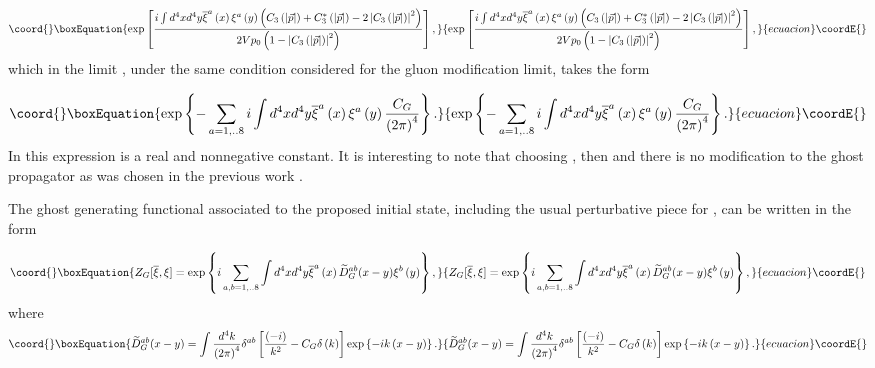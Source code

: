 \documentclass[12pt,letterpaper]{report}
\begin{document}
\begin{equation}\coord{}\boxEquation{
\exp \left[ \frac{i\int d^4xd^4y\overline{\xi }^a\left(x\right)
\xi ^a\left(y\right) \left(C_3\left(\left| \vec{p}\right| \right)
+C_3^{*}\left(\left| \vec{p}\right| \right) -2\left| C_3\left(
\left| \vec{p }\right| \right) \right| ^2\right) }{2Vp_0\left(
1-\left| C_3\left(\left| \vec{p}\right| \right) \right| ^2\right)
}\right],
}{
\exp \left[ \frac{i\int d^4xd^4y\overline{\xi }^a\left(x\right)
\xi ^a\left(y\right) \left(C_3\left(\left| \vec{p}\right| \right)
+C_3^{*}\left(\left| \vec{p}\right| \right) -2\left| C_3\left(
\left| \vec{p }\right| \right) \right| ^2\right) }{2Vp_0\left(
1-\left| C_3\left(\left| \vec{p}\right| \right) \right| ^2\right)
}\right],
}{ecuacion}\coordE{}\end{equation}
which in the limit \coordHE{}, under the same
condition considered for the gluon modification limit, takes the
form

\begin{equation}\coord{}\boxEquation{
\exp \left\{ -\sum\limits_{a=1,..8}i\int d^4xd^4y\overline{\xi
}^a\left(x\right) \xi ^a\left(y\right) \frac{C_G}{\left(2\pi
\right) ^4}\right\}.
}{
\exp \left\{ -\sum\limits_{a=1,..8}i\int d^4xd^4y\overline{\xi
}^a\left(x\right) \xi ^a\left(y\right) \frac{C_G}{\left(2\pi
\right) ^4}\right\}.
}{ecuacion}\coordE{}\end{equation}
In this expression \coordHE{} is a real and nonnegative constant. It is
interesting to note that choosing \coordHE{}, then
\coordHE{} and there is no modification to the ghost propagator as
was chosen in the previous work \cite{Cabo}.

The ghost generating functional associated to the proposed initial
state, including the usual perturbative piece for \coordHE{}, can
be written in the form

\begin{equation}\coord{}\boxEquation{
Z_G[\overline{\xi },\xi ]=\exp \left\{
i\sum\limits_{a,b=1,..8}\int d^4xd^4y \overline{\xi }^a\left(
x\right) \widetilde{D}_G^{ab}(x-y)\xi ^b\left(y\right) \right\},
}{
Z_G[\overline{\xi },\xi ]=\exp \left\{
i\sum\limits_{a,b=1,..8}\int d^4xd^4y \overline{\xi }^a\left(
x\right) \widetilde{D}_G^{ab}(x-y)\xi ^b\left(y\right) \right\},
}{ecuacion}\coordE{}\end{equation}
where
\begin{equation}\coord{}\boxEquation{
\widetilde{D}_G^{ab}(x-y)=\int \frac{d^4k}{\left(2\pi \right)
^4}\delta ^{ab}\left[ \frac{\left(-i\right) }{k^2}-C_G\delta
\left(k\right) \right] \exp \left\{ -ik\left(x-y\right) \right\}.
}{
\widetilde{D}_G^{ab}(x-y)=\int \frac{d^4k}{\left(2\pi \right)
^4}\delta ^{ab}\left[ \frac{\left(-i\right) }{k^2}-C_G\delta
\left(k\right) \right] \exp \left\{ -ik\left(x-y\right) \right\}.
}{ecuacion}\coordE{}\end{equation}
\end{document}
